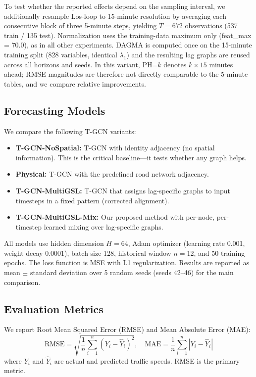 To test whether the reported effects depend on the sampling interval, we additionally resample Los-loop to 15-minute resolution by averaging each consecutive block of three 5-minute steps, yielding $T=672$ observations (537 train / 135 test). Normalization uses the training-data maximum only (feat\_max = 70.0), as in all other experiments. DAGMA is computed once on the 15-minute training split (828 variables, identical $\lambda_1$) and the resulting lag graphs are reused across all horizons and seeds. In this variant, PH=$k$ denotes $k \times 15$ minutes ahead; RMSE magnitudes are therefore not directly comparable to the 5-minute tables, and we compare relative improvements.

\subsection{Forecasting Models}

We compare the following T-GCN variants:

\begin{itemize}
    \item \textbf{T-GCN-NoSpatial:} T-GCN with identity adjacency (no spatial information). This is the critical baseline---it tests whether any graph helps.
    \item \textbf{Physical:} T-GCN with the predefined road network adjacency.
    \item \textbf{T-GCN-MultiGSL:} T-GCN that assigns lag-specific graphs to input timesteps in a fixed pattern (corrected alignment).
    \item \textbf{T-GCN-MultiGSL-Mix:} Our proposed method with per-node, per-timestep learned mixing over lag-specific graphs.
\end{itemize}

All models use hidden dimension $H=64$, Adam optimizer (learning rate 0.001, weight decay 0.0001), batch size 128, historical window $n=12$, and 50 training epochs. The loss function is MSE with L1 regularization. Results are reported as mean $\pm$ standard deviation over 5 random seeds (seeds 42--46) for the main comparison.

\subsection{Evaluation Metrics}

We report Root Mean Squared Error (RMSE) and Mean Absolute Error (MAE):
\begin{equation}
\text{RMSE} = \sqrt{\frac{1}{n}\sum_{i=1}^{n}(Y_i - \hat{Y}_i)^2}, \quad
\text{MAE} = \frac{1}{n}\sum_{i=1}^{n}|Y_i - \hat{Y}_i|
\end{equation}
where $Y_i$ and $\hat{Y}_i$ are actual and predicted traffic speeds. RMSE is the primary metric.

